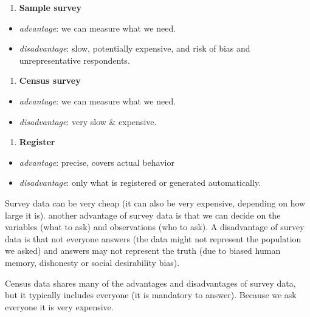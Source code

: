 \documentclass[
]{book}
\providecommand{\tightlist}{%
  \setlength{\itemsep}{0pt}\setlength{\parskip}{0pt}}
\begin{document}
\begin{enumerate}
\def\labelenumi{\arabic{enumi}.}
\setcounter{enumi}{1}
\tightlist
\item
  \textbf{Sample survey}
\end{enumerate}

\begin{itemize}
\tightlist
\item
  \emph{advantage}: we can measure what we need.
\item
  \emph{disadvantage}: slow, potentially expensive, and risk of bias and unrepresentative respondents.
\end{itemize}

\begin{enumerate}
\def\labelenumi{\arabic{enumi}.}
\setcounter{enumi}{2}
\tightlist
\item
  \textbf{Census survey}
\end{enumerate}

\begin{itemize}
\tightlist
\item
  \emph{advantage}: we can measure what we need.
\item
  \emph{disadvantage}: very slow \& expensive.
\end{itemize}

\begin{enumerate}
\def\labelenumi{\arabic{enumi}.}
\setcounter{enumi}{3}
\tightlist
\item
  \textbf{Register}
\end{enumerate}

\begin{itemize}
\tightlist
\item
  \emph{advantage}: precise, covers actual behavior
\item
  \emph{disadvantage}: only what is registered or generated automatically.
\end{itemize}

Survey data can be very cheap (it can also be very expensive, depending on how large it is). another advantage of survey data is that we can decide on the variables (what to ask) and observations (who to ask). A disadvantage of survey data is that not everyone answers (the data might not represent the population we asked) and answers may not represent the truth (due to biased human memory, dishonesty or social desirability bias).

Census data shares many of the advantages and disadvantages of survey data, but it typically includes everyone (it is mandatory to answer). Because we ask everyone it is very expensive.
\end{document}
